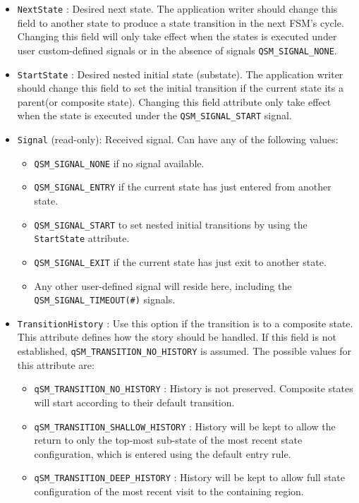\begin{itemize}
    \item \lstinline{NextState} : Desired next state. The application writer should change this field to another state to produce a state transition in the next FSM's cycle. Changing this field will only take effect when the states is executed under user custom-defined signals or in the absence of signals \lstinline{QSM_SIGNAL_NONE}.
    \item \lstinline{StartState} :  Desired nested initial state (substate). The application writer should change this field to set the initial transition if the current state its a parent(or composite state). Changing this field attribute only take effect when the state is executed under the \lstinline{QSM_SIGNAL_START} signal.
    \item \lstinline{Signal} (read-only): Received signal. Can have any of the following values: 
    \begin{itemize}
        \item \lstinline{QSM_SIGNAL_NONE} if no signal available.
        \item \lstinline{QSM_SIGNAL_ENTRY} if the current state has just entered from another state.
        \item \lstinline{QSM_SIGNAL_START} to set nested initial transitions by using the \lstinline{StartState} attribute.
        \item \lstinline{QSM_SIGNAL_EXIT} if the current state has just exit to another state.
        \item Any other user-defined signal will reside here, including the \lstinline{QSM_SIGNAL_TIMEOUT(#)} signals.
    \end{itemize}    
    \item \lstinline{TransitionHistory} : Use this option if the transition is to a composite state. This attribute defines how the story should be handled. If this field is not established, \lstinline{qSM_TRANSITION_NO_HISTORY} is assumed. The possible values for this attribute are:
    \begin{itemize}
        \item \lstinline{qSM_TRANSITION_NO_HISTORY} : History is not preserved. Composite states will start according to their default transition.
        \item \lstinline{qSM_TRANSITION_SHALLOW_HISTORY} : History will be kept to allow the return to only the top-most sub-state of the most recent state configuration, which is entered using the default entry rule.
        \item \lstinline{qSM_TRANSITION_DEEP_HISTORY} : History will be kept to allow full state configuration of the most recent visit to the containing region.

\end{itemize}
\end{itemize}

